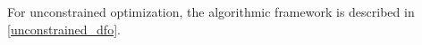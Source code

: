 \documentclass{article}
\theoremstyle{case}
\newcommand{\modelk}{{{m}_f}^{(k)}}
\newcommand{\iteratek}{{x}^{(k)}}
\newcommand{\trialk}{{{s}^{(k)}}}
\newcommand{\iteratekpone}{{x}^{(k+1)}}
\newcommand{\gradmodelk}{\nabla{{m}_f}^{(k)}}
\begin{document}
For unconstrained optimization, the algorithmic framework is described in \cref{unconstrained_dfo}.
\end{document}
